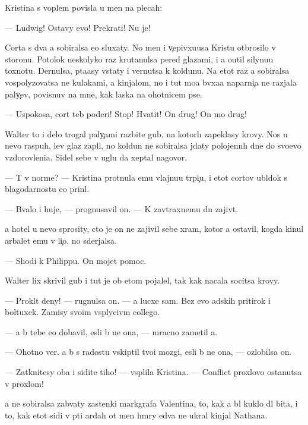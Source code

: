 \documentclass[10pt]{book}
\begin{document}
Kristina s voplem povisla u men{\ia} na plecah:

— Ludwig! Ostavy {\y}evo! Prekrati! Nu je!

Corta s dva {\y}a sobiralsa {\y}e{\y}o sluxaty. No men{\ia} i v{\c}epivxu{\y}usa Kristu otbrosilo v storonu. Potolok neskolyko raz krutanulsa pered glazami, i {\y}a o{\x}util silynu{\y}u toxnotu. Dernulsa, p{\yi}ta{\y}asy vstaty i vernutsa k koldunu. Na etot raz {\y}a sobiralsa vospolyzovatsa ne kulakami, a kinjalom, no i tut mo{\y}a b{\yi}vxa{\y}a naparni{\c}a ne razjala paly{\c}ev, povisnuv na mne, kak laska na ohotnic{\y}em pse.

— Uspoko{\y}sa, cort teb{\ia} poderi! Stop! Hvatit! On drug! On mo{\y} drug!



Walter to i delo trogal paly{\c}ami razbit{\yi}{\y}e gub{\yi}, na kotor{\yi}h zapeklasy krovy. Nos u nevo raspuh, lev{\yi}{\y} glaz zapl{\yi}l, no koldun ne sobiralsa jdaty polojenn{\yi}h dne{\y} do svo{\y}evo v{\yi}zdorovleni{\y}a. Sidel sebe v uglu da xeptal nagovor{\yi}.

— T{\yi} v norme? — Kristina prot{\ia}nula {\y}emu vlajnu{\y}u tr{\ia}pi{\c}u, i etot cortov ubl{\io}dok s blagodarnost{\y}u {\y}e{\y}o prin{\ia}l.

— B{\yi}valo i huje, — prognusavil on. — K zavtraxnemu dn{\io} zajiv{\e}t.

{\Y}a hotel u nevo sprosity, cto je on ne zajivil sebe xram, kotor{\yi}{\y} {\y}a ostavil, kogda kinul arbalet {\y}emu v li{\c}o, no sderjalsa.

— Shodi k Philippu. On mojet pomoc.

Walter lix skrivil gub{\yi} i tut je ob etom pojalel, tak kak nacala socitsa krovy.

— Prokl{\ia}t{\yi}{\y} deny! — rugnulsa on. — {\Y}a lucxe sam. Bez {\y}evo adskih pritirok i boltuxek. Za{\y}misy svo{\y}im vsp{\yi}lyciv{\yi}m collego{\y}.

— {\Y}a b{\yi} tebe {\y}e{\x}o dobavil, {\y}esli b{\yi} ne ona, — mracno zametil {\y}a.

— Ohotno ver{\io}. {\Y}a b{\yi} s radost{\y}u vskip{\ia}til tvo{\y}i mozgi, {\y}esli b{\yi} ne ona, — ozlobilsa on.

— Zatknitesy oba i sidite tiho! — vsp{\yi}lila Kristina. — Conflict{\yi} proxlovo ostanutsa v proxlom!

{\Y}a ne sobiralsa zab{\yi}vaty zastenki markgrafa Valentina, to, kak {\y}a b{\yi}l kuklo{\y} dl{\ia} bit{\y}a, i to, kak etot sid{\ia}{\x}i{\y} v p{\ia}ti {\y}ardah ot men{\ia} hm{\yi}ry {\y}edva ne ukral kinjal Nathana.
\end{document}
